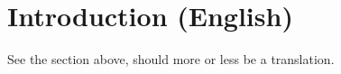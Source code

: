 \chapter{Introduction (English)}
\label{chap:intro-en}

See the section above, should more or less be a translation.